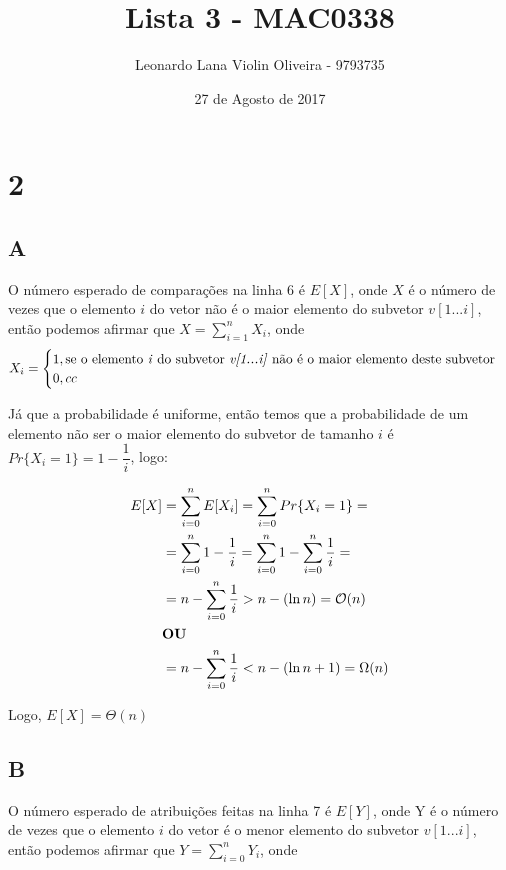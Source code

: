 \documentclass[a4paper, 12pt]{article}
\title{Lista 3 - MAC0338}
\author{Leonardo Lana Violin Oliveira - 9793735}
\date{27 de Agosto de 2017}
\begin{document}
\maketitle
\section*{2}
\subsection*{A}
O número esperado de comparações na linha 6 é $E[X]$, onde $X$ é o número de vezes que
o elemento $i$ do vetor não é o maior elemento do subvetor $v[1...i]$, então podemos
afirmar que $X = \sum_{i = 1}^{n} X_i$, onde
$$ X_i = 
\begin{cases}
1 , \text{se o elemento \textit{i} do subvetor \textit{v[1...i]} não é o maior
elemento deste subvetor} \\
0, cc
\end{cases}
$$

Já que a probabilidade é uniforme, então temos que a probabilidade de um elemento não
ser o maior elemento do subvetor de tamanho $i$ é $Pr\{X_i = 1\} = 1 - \dfrac{1}{i}$,
logo:

\begin{align*}
E[X] &= \sum_{i = 0}^{n} E[X_i] = \sum_{i=0}^{n} Pr\{X_i = 1\} = \\
	 &= \sum_{i = 0}^{n} 1 - \dfrac{1}{i} = 
     \sum_{i = 0}^{n} 1 - \sum_{i = 0}^{n} \dfrac{1}{i} = \\
     &= n - \sum_{i = 0}^{n} \dfrac{1}{i} > n - (\ln n) = \mathcal{O}(n) \\
     &\text{\textbf{OU}}\\
     &= n - \sum_{i = 0}^{n} \dfrac{1}{i} < n - (\ln n + 1) = \Omega(n)
\end{align*}

Logo, $E[X] = \Theta(n)$
\subsection*{B}

O número esperado de atribuições feitas na linha 7 é $E[Y]$, onde Y é o número de vezes
que o elemento $i$ do vetor é o menor elemento do subvetor $v[1...i]$, então podemos
afirmar que $Y = \sum_{i = 0}^{n} Y_i$, onde
\end{document}

